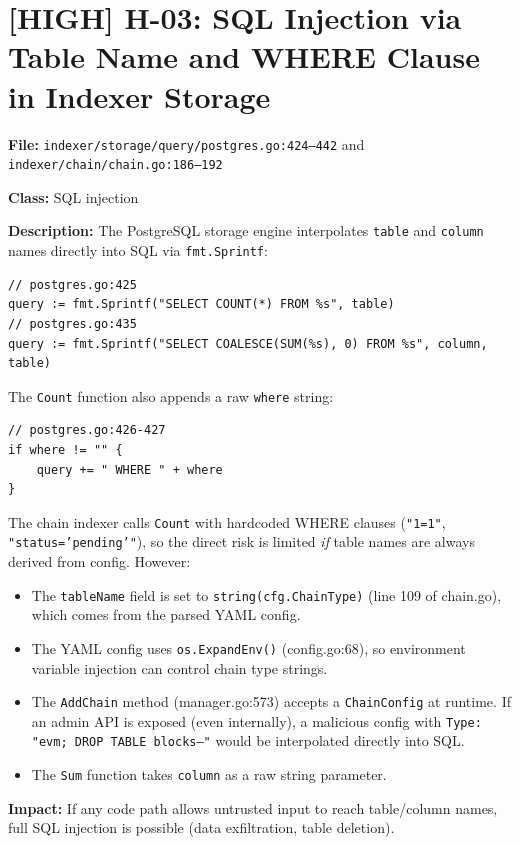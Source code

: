 \documentclass{article}
\begin{document}
\section{[HIGH] H-03: SQL Injection via Table Name and WHERE Clause in Indexer Storage}

\textbf{File:} \texttt{indexer/storage/query/postgres.go:424--442}
and \texttt{indexer/chain/chain.go:186--192}

\textbf{Class:} SQL injection

\textbf{Description:}
The PostgreSQL storage engine interpolates \texttt{table} and \texttt{column}
names directly into SQL via \texttt{fmt.Sprintf}:
\begin{lstlisting}
// postgres.go:425
query := fmt.Sprintf("SELECT COUNT(*) FROM %s", table)
// postgres.go:435
query := fmt.Sprintf("SELECT COALESCE(SUM(%s), 0) FROM %s", column, table)
\end{lstlisting}

The \texttt{Count} function also appends a raw \texttt{where} string:
\begin{lstlisting}
// postgres.go:426-427
if where != "" {
    query += " WHERE " + where
}
\end{lstlisting}

The chain indexer calls \texttt{Count} with hardcoded WHERE clauses
(\texttt{"1=1"}, \texttt{"status='pending'"}), so the direct risk is
limited \emph{if} table names are always derived from config. However:

\begin{itemize}
  \item The \texttt{tableName} field is set to \texttt{string(cfg.ChainType)}
        (line 109 of chain.go), which comes from the parsed YAML config.
  \item The YAML config uses \texttt{os.ExpandEnv()} (config.go:68), so
        environment variable injection can control chain type strings.
  \item The \texttt{AddChain} method (manager.go:573) accepts a \texttt{ChainConfig}
        at runtime. If an admin API is exposed (even internally), a malicious
        config with \texttt{Type: "evm; DROP TABLE blocks--"} would be
        interpolated directly into SQL.
  \item The \texttt{Sum} function takes \texttt{column} as a raw string parameter.
\end{itemize}

\textbf{Impact:} If any code path allows untrusted input to reach table/column
names, full SQL injection is possible (data exfiltration, table deletion).
\end{document}
